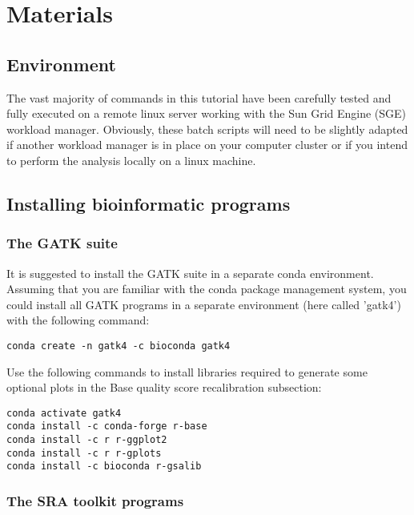\section{Materials}

\subsection{Environment}


The vast majority of commands in this tutorial have been carefully tested and fully executed on a remote linux server working with the Sun Grid Engine (SGE) workload manager. Obviously, these batch scripts will need to be slightly adapted if another workload manager is in place on your computer cluster or if you intend to perform the analysis locally on a linux machine.





\subsection{Installing bioinformatic programs}

\subsubsection{The GATK suite}

It is suggested to install the GATK suite in a separate conda environment. Assuming that you are familiar with the conda package management system, you could install all GATK programs in a separate environment (here called 'gatk4') with the following command:

\begin{verbatim}
conda create -n gatk4 -c bioconda gatk4 
\end{verbatim}


Use the following commands to install libraries required to generate some optional plots in the Base quality score recalibration subsection:

\begin{verbatim}
conda activate gatk4
conda install -c conda-forge r-base
conda install -c r r-ggplot2
conda install -c r r-gplots
conda install -c bioconda r-gsalib
\end{verbatim}


\subsubsection{The SRA toolkit programs}

